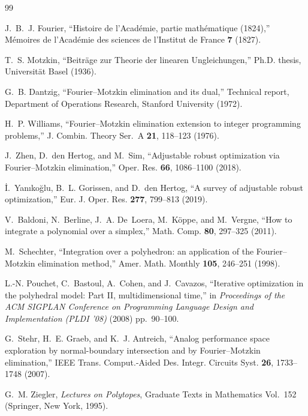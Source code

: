 \documentclass[11pt]{article}
\theoremstyle{definition}
\begin{document}
\begin{thebibliography}{99}

 J.~B.~J. Fourier, ``Histoire de l'Acad\'emie, partie math\'ematique (1824),'' M\'emoires de l'Acad\'emie des sciences de l'Institut de France \textbf{7} (1827).

 T.~S. Motzkin, ``Beitr\"age zur Theorie der linearen Ungleichungen,'' Ph.D. thesis, Universit\"at Basel (1936).

 G.~B. Dantzig, ``Fourier--Motzkin elimination and its dual,'' Technical report, Department of Operations Research, Stanford University (1972).

 H.~P. Williams, ``Fourier--Motzkin elimination extension to integer programming problems,'' J. Combin. Theory Ser.~A \textbf{21}, 118--123 (1976).

 J.~Zhen, D.~den Hertog, and M.~Sim, ``Adjustable robust optimization via Fourier--Motzkin elimination,'' Oper. Res. \textbf{66}, 1086--1100 (2018).

 \.I.~Yan{\i}ko\u{g}lu, B.~L. Gorissen, and D.~den Hertog, ``A survey of adjustable robust optimization,'' Eur. J. Oper. Res. \textbf{277}, 799--813 (2019).

 V.~Baldoni, N.~Berline, J.~A. De~Loera, M.~K\"oppe, and M.~Vergne, ``How to integrate a polynomial over a simplex,'' Math. Comp. \textbf{80}, 297--325 (2011).

 M.~Schechter, ``Integration over a polyhedron: an application of the Fourier--Motzkin elimination method,'' Amer. Math. Monthly \textbf{105}, 246--251 (1998).

 L.-N. Pouchet, C.~Bastoul, A.~Cohen, and J.~Cavazos, ``Iterative optimization in the polyhedral model: Part II, multidimensional time,'' in \emph{Proceedings of the ACM SIGPLAN Conference on Programming Language Design and Implementation (PLDI '08)} (2008) pp.~90--100.

 G.~Stehr, H.~E. Graeb, and K.~J. Antreich, ``Analog performance space exploration by normal-boundary intersection and by Fourier--Motzkin elimination,'' IEEE Trans. Comput.-Aided Des. Integr. Circuits Syst. \textbf{26}, 1733--1748 (2007).

 G.~M. Ziegler, \emph{Lectures on Polytopes}, Graduate Texts in Mathematics Vol.~152 (Springer, New York, 1995).


\end{thebibliography}
\end{document}
